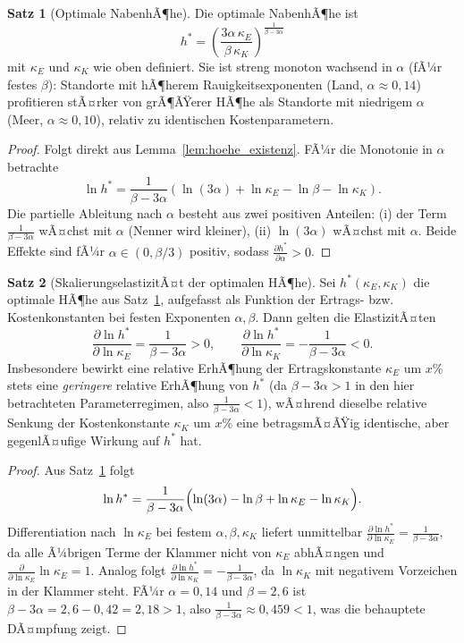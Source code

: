 ﻿\documentclass[a4paper,12pt]{article}
\theoremstyle{definition}
\newtheorem{satz}{Satz}
\begin{document}
\begin{satz}[Optimale NabenhÃ¶he]
\label{satz:hoehe_optimal}
Die optimale NabenhÃ¶he ist
\[
h^* = \left(\frac{3\alpha\,\kappa_E}{\beta\,\kappa_K}\right)^{\frac{1}{\beta-3\alpha}}
\]
mit $\kappa_E$ und $\kappa_K$ wie oben definiert. Sie ist streng monoton wachsend in $\alpha$ (fÃ¼r festes $\beta$): Standorte mit hÃ¶herem Rauigkeitsexponenten (Land, $\alpha\approx0{,}14$) profitieren stÃ¤rker von grÃ¶ÃŸerer HÃ¶he als Standorte mit niedrigem $\alpha$ (Meer, $\alpha\approx0{,}10$), relativ zu identischen Kostenparametern.
\end{satz}

\begin{proof}
Folgt direkt aus Lemma~\ref{lem:hoehe_existenz}. FÃ¼r die Monotonie in $\alpha$ betrachte
\[
\ln h^* = \frac{1}{\beta-3\alpha}\left(\ln(3\alpha) + \ln\kappa_E - \ln\beta - \ln\kappa_K\right).
\]
Die partielle Ableitung nach $\alpha$ besteht aus zwei positiven Anteilen: (i) der Term $\frac{1}{\beta-3\alpha}$ wÃ¤chst mit $\alpha$ (Nenner wird kleiner), (ii) $\ln(3\alpha)$ wÃ¤chst mit $\alpha$. Beide Effekte sind fÃ¼r $\alpha \in (0, \beta/3)$ positiv, sodass $\frac{\partial h^*}{\partial \alpha}>0$. \qedhere
\end{proof}

\begin{satz}[SkalierungselastizitÃ¤t der optimalen HÃ¶he]
\label{satz:elastizitaet_hoehe}
Sei $h^*(\kappa_E,\kappa_K)$ die optimale HÃ¶he aus Satz~\ref{satz:hoehe_optimal}, aufgefasst als Funktion der Ertrags- bzw. Kostenkonstanten bei festen Exponenten $\alpha,\beta$. Dann gelten die ElastizitÃ¤ten
\[
\frac{\partial \ln h^*}{\partial \ln \kappa_E} = \frac{1}{\beta-3\alpha} > 0,
\qquad
\frac{\partial \ln h^*}{\partial \ln \kappa_K} = -\frac{1}{\beta-3\alpha} < 0.
\]
Insbesondere bewirkt eine relative ErhÃ¶hung der Ertragskonstante $\kappa_E$ um $x\%$ stets eine \emph{geringere} relative ErhÃ¶hung von $h^*$ (da $\beta-3\alpha>1$ in den hier betrachteten Parameterregimen, also $\frac{1}{\beta-3\alpha}<1$), wÃ¤hrend dieselbe relative Senkung der Kostenkonstante $\kappa_K$ um $x\%$ eine betragsmÃ¤ÃŸig identische, aber gegenlÃ¤ufige Wirkung auf $h^*$ hat.
\end{satz}

\begin{proof}
Aus Satz~\ref{satz:hoehe_optimal} folgt
\[
\ln h^* = \frac{1}{\beta-3\alpha}\Bigl(\ln(3\alpha) - \ln\beta + \ln\kappa_E - \ln\kappa_K\Bigr).
\]
Differentiation nach $\ln\kappa_E$ bei festem $\alpha,\beta,\kappa_K$ liefert unmittelbar $\frac{\partial \ln h^*}{\partial\ln\kappa_E} = \frac{1}{\beta-3\alpha}$, da alle Ã¼brigen Terme der Klammer nicht von $\kappa_E$ abhÃ¤ngen und $\frac{\partial}{\partial\ln\kappa_E}\ln\kappa_E=1$. Analog folgt $\frac{\partial \ln h^*}{\partial\ln\kappa_K} = -\frac{1}{\beta-3\alpha}$, da $\ln\kappa_K$ mit negativem Vorzeichen in der Klammer steht. FÃ¼r $\alpha=0{,}14$ und $\beta=2{,}6$ ist $\beta-3\alpha=2{,}6-0{,}42=2{,}18>1$, also $\frac{1}{\beta-3\alpha}\approx0{,}459<1$, was die behauptete DÃ¤mpfung zeigt. \qedhere
\end{proof}
\end{document}
